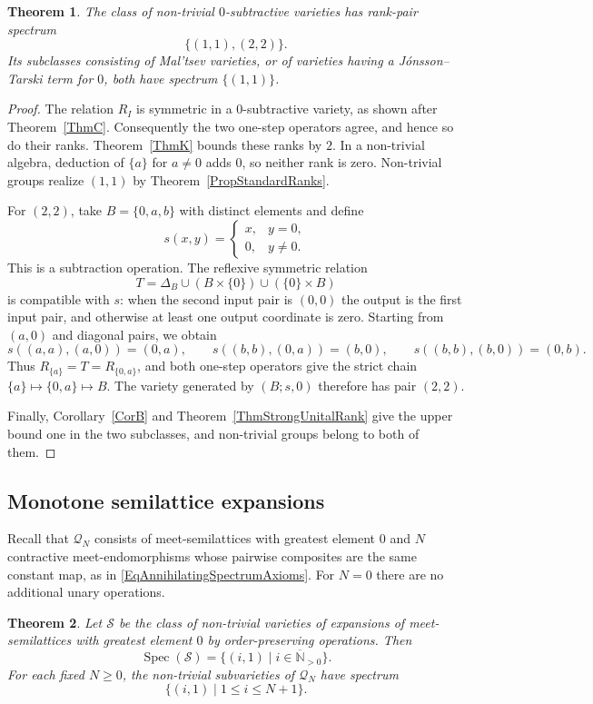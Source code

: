 \documentclass[12pt,english]{amsart}
\newtheorem{theorem}{Theorem}[section]
\theoremstyle{definition}
\numberwithin{equation}{section}
\theoremstyle{remark}
\begin{document}
\begin{theorem}\label{ThmSpecialSubtractiveSpectrum}
The class of non-trivial $0$-subtractive varieties has rank-pair spectrum
\[
\{(1,1),(2,2)\}.
\]
Its subclasses consisting of Mal'tsev varieties, or of varieties having
a J\'onsson--Tarski term for $0$, both have spectrum $\{(1,1)\}$.
\end{theorem}

\begin{proof}
The relation $R_I$ is symmetric in a $0$-subtractive variety, as shown
after Theorem~\ref{ThmC}. Consequently the two one-step operators agree,
and hence so do their ranks. Theorem~\ref{ThmK} bounds these ranks by
$2$. In a non-trivial algebra, deduction of $\{a\}$ for $a\ne0$ adds
$0$, so neither rank is zero. Non-trivial groups realize $(1,1)$ by
Theorem~\ref{PropStandardRanks}.

For $(2,2)$, take $B=\{0,a,b\}$ with distinct elements and define
\[
s(x,y)=\begin{cases}x,&y=0,\\0,&y\ne0.\end{cases}
\]
This is a subtraction operation. The reflexive symmetric relation
\[
T=\Delta_B\cup(B\times\{0\})\cup(\{0\}\times B)
\]
is compatible with $s$: when the second input pair is $(0,0)$ the
output is the first input pair, and otherwise at least one output
coordinate is zero. Starting from $(a,0)$ and diagonal pairs, we obtain
\[
s((a,a),(a,0))=(0,a),\qquad
s((b,b),(0,a))=(b,0),\qquad
s((b,b),(b,0))=(0,b).
\]
Thus $R_{\{a\}}=T=R_{\{0,a\}}$, and both one-step operators give
the strict chain $\{a\}\mapsto\{0,a\}\mapsto B$.
The variety generated by $(B;s,0)$ therefore has pair $(2,2)$.

Finally, Corollary~\ref{CorB} and
Theorem~\ref{ThmStrongUnitalRank} give the upper bound one in the two
subclasses, and non-trivial groups belong to both of them.
\end{proof}

\subsection{Monotone semilattice expansions}

Recall that $\mathcal Q_N$ consists of meet-semilattices with greatest
element $0$ and $N$ contractive meet-endomorphisms whose pairwise
composites are the same constant map, as in
\eqref{EqAnnihilatingSpectrumAxioms}. For $N=0$ there are no additional
unary operations.

\begin{theorem}\label{ThmSpecialMeetSpectrum}
Let $\mathscr S$ be the class of non-trivial varieties of expansions
of meet-semilattices with greatest element $0$ by order-preserving
operations. Then
\[
\operatorname{Spec}(\mathscr S)
=\{(i,1)\mid i\in\overline{\mathbb N}_{>0}\}.
\]
For each fixed $N\geqslant0$, the non-trivial subvarieties of
$\mathcal Q_N$ have spectrum
\[
\{(i,1)\mid 1\leqslant i\leqslant N+1\}.
\]
\end{theorem}
\end{document}

